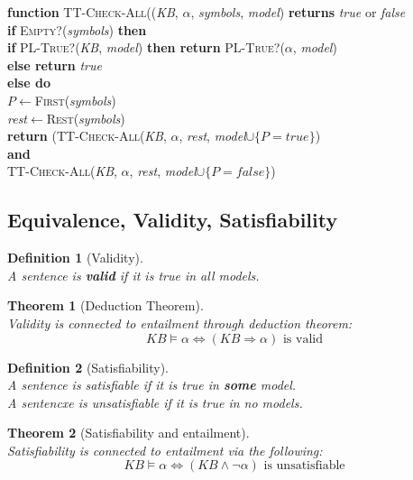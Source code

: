 \documentclass[12pt]{article}
\newcommand{\ind}{\hspace*{15pt}}
\newtheorem{definition}{Definition}[section]
\newtheorem{theorem}{Theorem}[section]
\theoremstyle{definition}
\begin{document}
\textbf{function} \textsc{TT-Check-All}((\textit{KB}, $\alpha$, \textit{symbols}, \textit{model}) \textbf{returns} \textit{true} or \textit{false}\\
\ind \textbf{if} \textsc{Empty?}(\textit{symbols}) \textbf{then}\\
\ind \ind \textbf{if} \textsc{PL-True?}(\textit{KB}, \textit{model}) \textbf{then return} \textsc{PL-True?}($\alpha$, \textit{model})\\
\ind \ind \textbf{else return} \textit{true}\\
\ind \textbf{else do}\\
\ind \ind $P\leftarrow$\textsc{First}(\textit{symbols})\\
\ind \ind \textit{rest}$\leftarrow$\textsc{Rest}(\textit{symbols})\\
\ind \ind \textbf{return} (\textsc{TT-Check-All}(\textit{KB}, $\alpha$, \textit{rest}, \textit{model}$\cup\{P=\textit{true}\}$)\\
\ind \ind \ind \ind \textbf{and}\\
\ind \ind \ind \ind \textsc{TT-Check-All}(\textit{KB}, $\alpha$, \textit{rest}, \textit{model}$\cup\{P=\textit{false}\}$)

\subsection{Equivalence, Validity, Satisfiability}
\begin{definition}[Validity]
\hfill\\\normalfont A sentence is \textbf{valid} if it is true in \textit{all} models.
\end{definition}
\begin{theorem}[Deduction Theorem]
\hfill\\\normalfont Validity is connected to entailment through deduction theorem:
\[
KB\models \alpha\Leftrightarrow (KB\Rightarrow \alpha) \text{ is valid}
\]
\end{theorem}
\begin{definition}[Satisfiability]
\hfill\\\normalfont A sentence is satisfiable if it is true in \textbf{some} model.\\
A sentencxe is unsatisfiable if it is true in \textit{no} models.
\end{definition}
\begin{theorem}[Satisfiability and entailment]
\hfill\\\normalfont Satisfiability is connected to entailment via the following:
\[
KB\models \alpha \Leftrightarrow (KB\land \neg \alpha) \text{ is unsatisfiable}
\]
\end{theorem}
\end{document}

